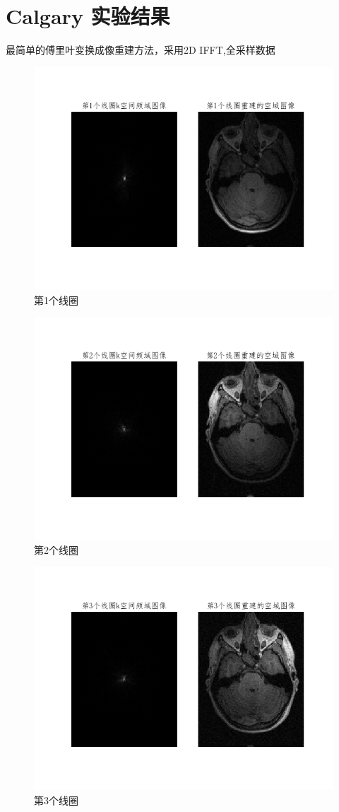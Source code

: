 \chapter{Calgary 实验结果}

最简单的傅里叶变换成像重建方法，采用2D IFFT,全采样数据


\begin{figure}[H]
    \centering
    \includegraphics[width=0.6\linewidth]{fig/coil1.png}
    \caption{第1个线圈}
    \label{fig:coil1}
\end{figure}


\begin{figure}[H]
    \centering
    \includegraphics[width=0.6\linewidth]{fig/coil2.png}
    \caption{第2个线圈}
    \label{fig:coil2}
\end{figure}


\begin{figure}[H]
    \centering
    \includegraphics[width=0.6\linewidth]{fig/coil3.png}
    \caption{第3个线圈}
    \label{fig:coil3}
\end{figure}


